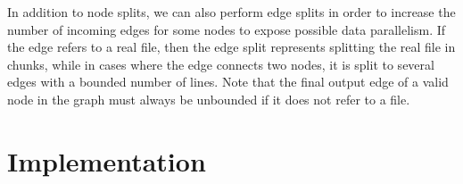 \documentclass[sigplan,10pt,review,anonymous]{acmart}
\newcommand{\kk}[1]{[{\color{magenta}#1 --- kk}]}
\newcommand{\tr}[1]{} %
\begin{document}
\tr{Remember to mention the assumptions that need to hold for the
  graph transformations to be valid in the Command categories
  section. Commands must be deterministic, they must not do any other
  side effect (such as writing to other files, sending signals,
  etc). However, these assumptions must already be checked when the
  developer designates the categories.}

\tr{If there is time I can work out a formal definition and a proof
  sketch why this transformation preserves the output of the dataflow
  graph.}



In addition to node splits, we can also perform edge splits in order
to increase the number of incoming edges for some nodes to expose
possible data parallelism. If the edge refers to a real file, then the
edge split represents splitting the real file in chunks, while in
cases where the edge connects two nodes, it is split to several edges
with a bounded number of lines. Note that the final output edge of a
valid node in the graph must always be unbounded if it does not refer
to a file.





\section{Implementation}
\label{impl}
% 
\end{document}
